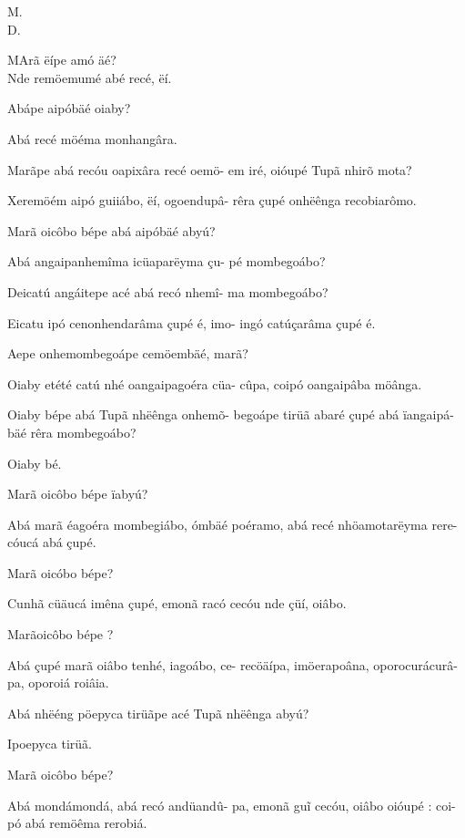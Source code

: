 \documentclass[openany,titlepage,12pt]{book}
\newcommand{\comecalista}[5]{
    \hspace*{-11.7pt}
    \begin{minipage}[t]{0.08\linewidth}
        \flushright #1\\#2
    \end{minipage}
    \hspace{0pt}
    \begin{minipage}[t]{0.94\linewidth}
        \lettrine
        [findent =2pt, nindent=0pt,  lines=2]
        {#3}{#4}#5
    \end{minipage}
    \vspace*{-3pt}
}
\begin{document}
\comecalista{M.}{D.}{M}{A}
{rã ëípe amó äé?\\
 Nde remöemumé abé recé, ëí.
}
\begin{alternate}
    \item Abápe aipóbäé oiaby?
    \item Abá recé möéma monhangâra.
    \item Marãpe abá recóu oapixâra recé oemö-
        em iré, oióupé Tupã nhirõ mota?
    \item Xeremöém aipó guiiábo, ëí, ogoendupâ-
        rêra çupé onhëênga recobiarômo.
    \item Marã oicôbo bépe abá aipóbäé abyú?
    \item Abá angaipanhemîma icüaparëyma çu-
        pé mombegoábo?
    \item Deicatú angáitepe acé abá recó nhemî-
        ma mombegoábo?
    \item Eicatu ipó cenonhendarâma çupé é, imo-
        ingó catúçarâma çupé é.
    \item Aepe onhemombegoápe cemöembäé,\linebreak
        marã?
    \item Oiaby etété catú nhé oangaipagoéra cüa-
        cûpa, coipó oangaipâba möânga.
    \item Oiaby bépe abá Tupã nhëênga onhemõ-
        begoápe tirüã abaré çupé abá ïangaipá-\linebreak
        bäé rêra mombegoábo?
    \item Oiaby bé.
    \item Marã oicôbo bépe ïabyú?
    \item Abá marã éagoéra mombegiábo, ómbäé
        poéramo, abá recé nhöamotarëyma rere-
        cóucá abá çupé.
    \item Marã oicóbo bépe?
    \item Cunhã cüäucá  imêna çupé, emonã racó
    \unskip\vspace*{-2pt}    
        cecóu nde çüí, oiâbo.
    \newpage
    \item Marãoicôbo bépe ?
    \item Abá çupé marã oiâbo tenhé, iagoábo, ce-
        recöäípa, imöerapoâna, oporocurácurâ-\linebreak
        pa, oporoiá roiâia.
    \item Abá nhëéng pöepyca tirüãpe acé Tupã
        nhëênga abyú?
    \item Ipoepyca tirüã.
    \item Marã oicôbo bépe?
    \item Abá mondámondá, abá recó andüandû-
        pa, emonã gu\~i cecóu, oiâbo oióupé : coi-
        pó abá remöêma rerobiá.
\end{alternate}
\end{document}
